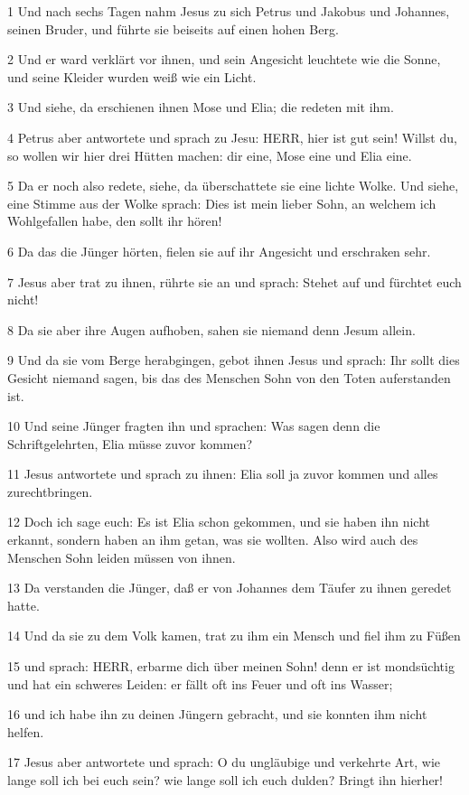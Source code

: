 \par 1 Und nach sechs Tagen nahm Jesus zu sich Petrus und Jakobus und Johannes, seinen Bruder, und führte sie beiseits auf einen hohen Berg.
\par 2 Und er ward verklärt vor ihnen, und sein Angesicht leuchtete wie die Sonne, und seine Kleider wurden weiß wie ein Licht.
\par 3 Und siehe, da erschienen ihnen Mose und Elia; die redeten mit ihm.
\par 4 Petrus aber antwortete und sprach zu Jesu: HERR, hier ist gut sein! Willst du, so wollen wir hier drei Hütten machen: dir eine, Mose eine und Elia eine.
\par 5 Da er noch also redete, siehe, da überschattete sie eine lichte Wolke. Und siehe, eine Stimme aus der Wolke sprach: Dies ist mein lieber Sohn, an welchem ich Wohlgefallen habe, den sollt ihr hören!
\par 6 Da das die Jünger hörten, fielen sie auf ihr Angesicht und erschraken sehr.
\par 7 Jesus aber trat zu ihnen, rührte sie an und sprach: Stehet auf und fürchtet euch nicht!
\par 8 Da sie aber ihre Augen aufhoben, sahen sie niemand denn Jesum allein.
\par 9 Und da sie vom Berge herabgingen, gebot ihnen Jesus und sprach: Ihr sollt dies Gesicht niemand sagen, bis das des Menschen Sohn von den Toten auferstanden ist.
\par 10 Und seine Jünger fragten ihn und sprachen: Was sagen denn die Schriftgelehrten, Elia müsse zuvor kommen?
\par 11 Jesus antwortete und sprach zu ihnen: Elia soll ja zuvor kommen und alles zurechtbringen.
\par 12 Doch ich sage euch: Es ist Elia schon gekommen, und sie haben ihn nicht erkannt, sondern haben an ihm getan, was sie wollten. Also wird auch des Menschen Sohn leiden müssen von ihnen.
\par 13 Da verstanden die Jünger, daß er von Johannes dem Täufer zu ihnen geredet hatte.
\par 14 Und da sie zu dem Volk kamen, trat zu ihm ein Mensch und fiel ihm zu Füßen
\par 15 und sprach: HERR, erbarme dich über meinen Sohn! denn er ist mondsüchtig und hat ein schweres Leiden: er fällt oft ins Feuer und oft ins Wasser;
\par 16 und ich habe ihn zu deinen Jüngern gebracht, und sie konnten ihm nicht helfen.
\par 17 Jesus aber antwortete und sprach: O du ungläubige und verkehrte Art, wie lange soll ich bei euch sein? wie lange soll ich euch dulden? Bringt ihn hierher!
